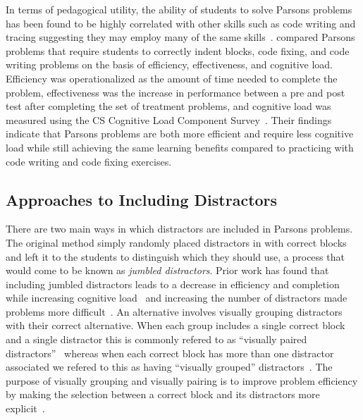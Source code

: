 \documentclass[authorversion,nonacm]{acmart}
\begin{document}
In terms of pedagogical utility, the ability of students to solve Parsons
problems has been found to be highly correlated with other skills such as code
writing and tracing suggesting they may employ many of the same
skills~\cite{whalley2007many, lopez2008relationships, venables2009closer,
fowler2022reevaluating}.  \citet{ericson2017solving} compared Parsons problems
that require students to correctly indent blocks, code fixing, and code writing
problems on the basis of efficiency, effectiveness, and cognitive load.
Efficiency was operationalized as the amount of time needed to complete the
problem, effectiveness was the increase in performance between a pre and post
test after completing the set of treatment problems, and cognitive load was
measured using the CS Cognitive Load Component
Survey~\cite{morrison2014measuring}. Their findings indicate that Parsons
problems are both more efficient and require less cognitive load while still
achieving the same learning benefits compared to practicing with code writing
and code fixing exercises.

\subsection{Approaches to Including Distractors}

There are two main ways in which distractors are included in Parsons problems.
The original method simply randomly placed distractors in with correct blocks
and left it to the students to distinguish which they should use, a process that
would come to be known as \textit{jumbled distractors}.  Prior work has found
that including jumbled distractors leads to a decrease in efficiency and
completion while increasing cognitive load~\cite{garner2007exploration,
harms2016distractors} and increasing the number of distractors made problems
more difficult~\cite{ericson2015analysis}.  An alternative involves visually
grouping distractors with their correct alternative.  When each group includes a
single correct block and a single distractor this is commonly refered to as
``visually paired distractors''~\cite{denny2008evaluating} whereas when each
correct block has more than one distractor associated we refered to this as
having ``visually grouped'' distractors~\cite{smith2023comparing}.  The purpose
of visually grouping and visually pairing is to improve problem efficiency by
making the selection between a correct block and its distractors more
explicit~\cite{denny2008evaluating}.
\end{document}

